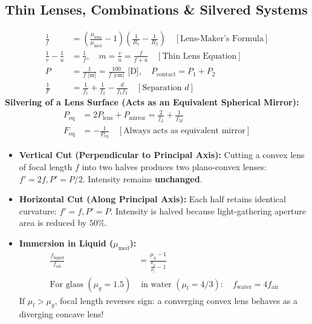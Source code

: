 \documentclass[10pt,twoside,openright]{book}
\begin{document}
\subsection{Thin Lenses, Combinations \& Silvered Systems}

\begin{formulabox}
\begin{align}
  \frac{1}{f} &= \left(\frac{\mu_{\text{lens}}}{\mu_{\text{med}}} - 1\right)\left(\frac{1}{R_1} - \frac{1}{R_2}\right) \quad [\text{Lens-Maker's Formula}] \\
  \frac{1}{v} - \frac{1}{u} &= \frac{1}{f}, \quad m = \frac{v}{u} = \frac{f}{f + u} \quad [\text{Thin Lens Equation}] \\
  P &= \frac{1}{f\text{ [m]}} = \frac{100}{f\text{ [cm]}}\text{ [D]}, \quad P_{\text{contact}} = P_1 + P_2 \\
  \frac{1}{F} &= \frac{1}{f_1} + \frac{1}{f_2} - \frac{d}{f_1 f_2} \quad [\text{Separation } d]
\end{align}
\textbf{Silvering of a Lens Surface (Acts as an Equivalent Spherical Mirror):}
\begin{align}
  P_{\text{eq}} &= 2P_{\text{lens}} + P_{\text{mirror}} = \frac{2}{f_L} + \frac{1}{f_M} \\
  F_{\text{eq}} &= -\frac{1}{P_{\text{eq}}} \quad [\text{Always acts as equivalent mirror}] \nonumber
\end{align}
\end{formulabox}

\begin{usecasebox}
\begin{itemize}
  \item \textbf{Vertical Cut (Perpendicular to Principal Axis):} Cutting a convex lens of focal length $f$ into two halves produces two plano-convex lenses: $f' = 2f, P' = P/2$. Intensity remains \textbf{unchanged}.
  \item \textbf{Horizontal Cut (Along Principal Axis):} Each half retains identical curvature: $f' = f, P' = P$. Intensity is halved because light-gathering aperture area is reduced by $50\%$.
  \item \textbf{Immersion in Liquid ($\mu_{\text{med}}$):}
  \begin{align*}
    \frac{f_{\text{liquid}}}{f_{\text{air}}} &= \frac{\mu_g - 1}{\frac{\mu_g}{\mu_l} - 1} \\
    \text{For glass } (\mu_g=1.5) &\text{ in water } (\mu_l=4/3): \quad f_{\text{water}} = 4 f_{\text{air}}
  \end{align*}
  If $\mu_l > \mu_g$, focal length reverses sign: a converging convex lens behaves as a diverging concave lens!
\end{itemize}
\end{usecasebox}
\end{document}
